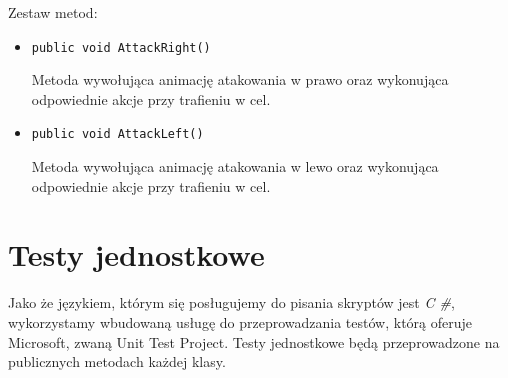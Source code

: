 \documentclass[12pt, a4paper]{article}
\begin{document}
\begin{enumerate}
Zestaw metod$\colon$

\begin{itemize}
\item \texttt{public void AttackRight()}

Metoda wywołująca animację atakowania w prawo oraz wykonująca odpowiednie 
akcje przy trafieniu w cel.

\item \texttt{public void AttackLeft()}

Metoda wywołująca animację atakowania w lewo oraz wykonująca odpowiednie 
akcje przy trafieniu w cel.

\end{itemize}

\end{enumerate}

\section{Testy jednostkowe}

Jako że językiem, którym się posługujemy do pisania skryptów jest \textit{C
\#}, wykorzystamy wbudowaną usługę do przeprowadzania testów, którą oferuje 
Microsoft, zwaną Unit Test Project. Testy jednostkowe będą przeprowadzone na 
publicznych metodach każdej klasy.
\end{document}
